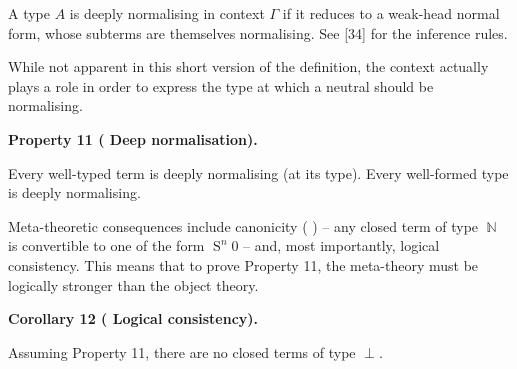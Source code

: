   
A type $A$ is deeply normalising in context $\Gamma$ if it reduces to a weak-head normal form, whose subterms are themselves normalising. See [34] for the inference rules.\par
 
 
 
 
While not apparent in this short version of the definition, the context actually plays a role in order to express the type at which a neutral should be normalising.\par
 
 
 
\par\medskip\noindent\textbf{Property 11 (  Deep normalisation).}\par
 
 
Every well-typed term is deeply normalising (at its type). Every well-formed type is deeply normalising.\par
 
 
 
 
Meta-theoretic consequences include canonicity ( ) – any closed term of type $\operatorname{\mathbb{N}}$ is convertible to one of the form $\operatorname{S}^{n}0$ – and, most importantly, logical consistency. This means that to prove Property 11, the meta-theory must be logically stronger than the object theory.\par
 
 
 
\par\medskip\noindent\textbf{Corollary 12 (  Logical consistency).}\par
 
 
Assuming Property 11, there are no closed terms of type $\operatorname{\bot}$.\par
 
 
 
 
